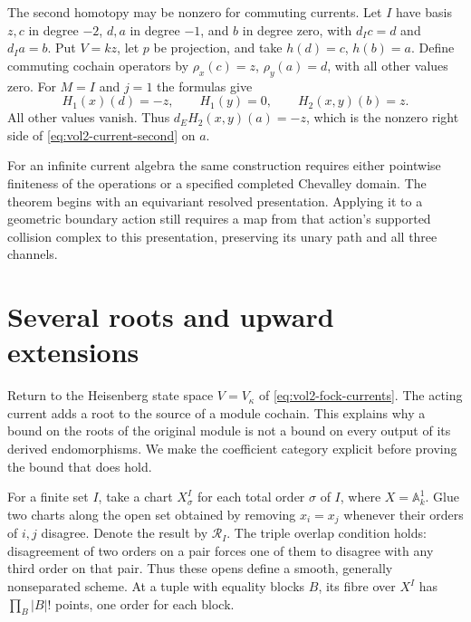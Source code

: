 \begin{example}\label{ex:vol2-second-current}
The second homotopy may be nonzero for commuting currents. Let $I$
have basis $z,c$ in degree $-2$, $d,a$ in degree $-1$, and $b$ in
degree zero, with $d_Ic=d$ and $d_Ia=b$. Put $V=kz$, let $p$ be
projection, and take $h(d)=c$, $h(b)=a$. Define commuting cochain
operators by $\rho_x(c)=z$, $\rho_y(a)=d$, with all other values
zero. For $M=I$ and $j=1$ the formulas give
\[
 H_1(x)(d)=-z,\qquad H_1(y)=0,\qquad H_2(x,y)(b)=z.
\]
All other values vanish. Thus $d_EH_2(x,y)(a)=-z$, which is
the nonzero right side of \eqref{eq:vol2-current-second} on $a$.
\end{example}

For an infinite current algebra the same construction requires either
pointwise finiteness of the operations or a specified completed
Chevalley domain. The theorem begins with an equivariant resolved
presentation. Applying it to a geometric boundary action still
requires a map from that action's supported collision complex to
this presentation, preserving its unary path and all three channels.

\section{Several roots and upward extensions}
\label{sec:vol2-root-support}

Return to the Heisenberg state space $V=V_\kappa$ of
\eqref{eq:vol2-fock-currents}. The acting current adds a root to
the source of a module cochain.
This explains why a bound on the roots of the original module is not
a bound on every output of its derived endomorphisms. We make the
coefficient category explicit before proving the bound that does hold.

For a finite set $I$, take a chart $X^I_\sigma$ for each total order
$\sigma$ of $I$, where $X=\mathbb A^1_k$. Glue two charts along the
open set obtained by removing $x_i=x_j$ whenever their orders of
$i,j$ disagree. Denote the result by $\mathscr R_I$. The triple
overlap condition holds: disagreement of two orders on a pair forces
one of them to disagree with any third order on that pair. Thus these
opens define a smooth, generally nonseparated scheme. At a tuple
with equality blocks $B$, its fibre over $X^I$ has
$\prod_B|B|!$ points, one order for each block.

